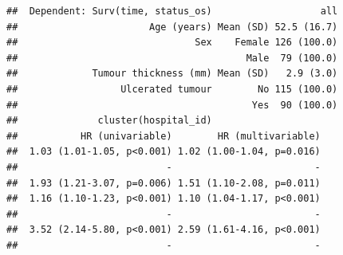 \documentclass[
  12pt,
  krantz2]{krantz}
\makeatletter
\newenvironment{Shaded}{\begin{snugshade}}{\end{snugshade}}
\newcommand{\CommentTok}[1]{\textcolor[rgb]{0.56,0.35,0.01}{\textit{#1}}}
\newcommand{\KeywordTok}[1]{\textcolor[rgb]{0.13,0.29,0.53}{\textbf{#1}}}
\newcommand{\NormalTok}[1]{#1}
\newcommand{\OperatorTok}[1]{\textcolor[rgb]{0.81,0.36,0.00}{\textbf{#1}}}
\newcommand{\StringTok}[1]{\textcolor[rgb]{0.31,0.60,0.02}{#1}}
\newenvironment{kframe}{%
\medskip{}
\setlength{\fboxsep}{.8em}
 \def\at@end@of@kframe{}%
 \ifinner\ifhmode%
  \def\at@end@of@kframe{\end{minipage}}%
  \begin{minipage}{\columnwidth}%
 \fi\fi%
 \def\FrameCommand##1{\hskip\@totalleftmargin \hskip-\fboxsep
 \colorbox{shadecolor}{##1}\hskip-\fboxsep
     \hskip-\linewidth \hskip-\@totalleftmargin \hskip\columnwidth}%
 \MakeFramed {\advance\hsize-\width
   \@totalleftmargin\z@ \linewidth\hsize
   \@setminipage}}%
 {\par\unskip\endMakeFramed%
 \at@end@of@kframe}
\renewenvironment{Shaded}{\begin{kframe}}{\end{kframe}}
\makeatother
\begin{document}
\begin{verbatim}
##  Dependent: Surv(time, status_os)                   all
##                       Age (years) Mean (SD) 52.5 (16.7)
##                               Sex    Female 126 (100.0)
##                                        Male  79 (100.0)
##             Tumour thickness (mm) Mean (SD)   2.9 (3.0)
##                  Ulcerated tumour        No 115 (100.0)
##                                         Yes  90 (100.0)
##              cluster(hospital_id)                      
##           HR (univariable)        HR (multivariable)
##  1.03 (1.01-1.05, p<0.001) 1.02 (1.00-1.04, p=0.016)
##                          -                         -
##  1.93 (1.21-3.07, p=0.006) 1.51 (1.10-2.08, p=0.011)
##  1.16 (1.10-1.23, p<0.001) 1.10 (1.04-1.17, p<0.001)
##                          -                         -
##  3.52 (2.14-5.80, p<0.001) 2.59 (1.61-4.16, p<0.001)
##                          -                         -
\end{verbatim}

\begin{Shaded}
\end{Shaded}

\begin{table}[!h]

\caption{\label{tab:unnamed-chunk-22}Cox Proportional Hazards: Overall survival following surgery for melanoma (frailty model).}
\centering
{}
\end{table}
\end{document}
